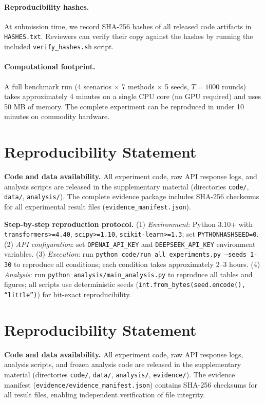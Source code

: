\documentclass[11pt]{article}
\begin{document}
\paragraph{Reproducibility hashes.}
At submission time, we record SHA-256 hashes of all released code
artifacts in \texttt{HASHES.txt}. Reviewers can verify their copy
against the hashes by running the included \texttt{verify\_hashes.sh}
script.

\paragraph{Computational footprint.}
A full benchmark run (4 scenarios $\times$ 7 methods $\times$ 5 seeds,
$T=1000$ rounds) takes approximately 4 minutes on a single CPU core
(no GPU required) and uses 50 MB of memory. The complete experiment
can be reproduced in under 10 minutes on commodity hardware.


\section*{Reproducibility Statement}

\textbf{Code and data availability.} All experiment code, raw API response logs, and analysis scripts are released in the supplementary material (directories \texttt{code/}, \texttt{data/}, \texttt{analysis/}). The complete evidence package includes SHA-256 checksums for all experimental result files (\texttt{evidence\_manifest.json}).

\textbf{Step-by-step reproduction protocol.} (1) \textit{Environment}: Python 3.10+ with \texttt{transformers>=4.40}, \texttt{scipy>=1.10}, \texttt{scikit-learn>=1.3}; set \texttt{PYTHONHASHSEED=0}. (2) \textit{API configuration}: set \texttt{OPENAI\_API\_KEY} and \texttt{DEEPSEEK\_API\_KEY} environment variables. (3) \textit{Execution}: run \texttt{python code/run\_all\_experiments.py --seeds 1-30} to reproduce all conditions; each condition takes approximately 2--3 hours. (4) \textit{Analysis}: run \texttt{python analysis/main\_analysis.py} to reproduce all tables and figures; all scripts use deterministic seeds (\texttt{int.from\_bytes(seed.encode(), ``little'')}) for bit-exact reproducibility.


\section*{Reproducibility Statement}
\label{sec:reproducibility}

\textbf{Code and data availability.} All experiment code, raw API response logs, analysis scripts, and frozen analysis code are released in the supplementary material (directories \texttt{code/}, \texttt{data/}, \texttt{analysis/}, \texttt{evidence/}). The evidence manifest (\texttt{evidence/evidence\_manifest.json}) contains SHA-256 checksums for all result files, enabling independent verification of file integrity.
\end{document}
